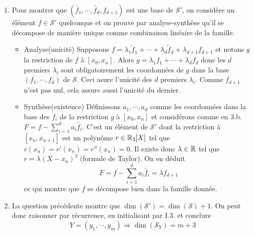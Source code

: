 \begin{enumerate}
  \item Pour montrer que $(\widetilde{f_1},\cdots,\widetilde{f_{d}},f_{d+1})$ est une base de $\mathcal{S}'$, on considère un élément $f\in \mathcal{S}'$ quelconque et on prouve par analyse-synthèse qu'il se décompose de manière unique comme combinaison linéaire de la famille.
\begin{itemize}
  \item Analyse(unicité) Supposons $f=\lambda_1 \widetilde{f}_1 + \cdots + \lambda_d \widetilde{f}_d + \lambda_{d+1}f_{d+1}$ et notons $g$ la restriction de $f$ à $[x_0,x_n]$. Alors $g=\lambda_1 f_1 + \cdots + \lambda_d f_d$ donc les $d$ premiers $\lambda_i$ sont obligatoirement les coordonnées de $g$ dans la base $(f_1,\cdots,f_d)$ de $\mathcal{S}$. Ceci asure l'unicité des $d$ premiers $\lambda_i$. Comme $f_{d+1}$ n'est pas nul, cela assure aussi l'unicité du dernier.
  \item Synthèse(existence)  Définissons $a_1,\cdots, a_d$ comme les coordonnées dans la base des $f_i$ de la restriction $g$ à $[x_0,x_n]$ et considérons comme en 3.b. $F = f-\sum\limits_{i=1}^{d} a_i \widetilde{f_i}$. C'est un élément de $\mathcal{S}'$ dont la restriction à $[x_n,x_{n+1}]$ est un polynôme $r\in \mathbb{R}_3[X]$ tel que $r(x_n) = r'(x_n) = r''(x_n)=0$. Il existe donc $\lambda \in \mathbb{R}$ tel que $r=\lambda (X-x_n)^3$ (formule de Taylor). On en déduit
\begin{displaymath}
  F = f-\sum\limits_{i=1}^{d} a_i \widetilde{f_i} = \lambda f_{d+1}
\end{displaymath}
ce qui montre que $f$ se décompose bien dans la famille donnée.
\end{itemize}

  \item La question précédente montre que $\dim(\mathcal{S}')= \dim(\mathcal{S})+1$. On peut donc raisonner par récurrence, en initialisant par I.3. et conclure
\begin{displaymath}
  Y=(y_1,\cdots,y_m) \Rightarrow \dim(\mathcal{S}_Y) = m + 3
\end{displaymath}
\end{enumerate}

